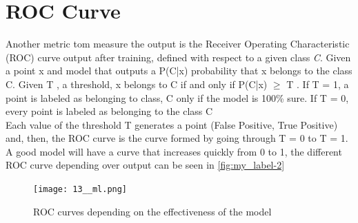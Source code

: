 \section{ROC Curve}
Another metric tom measure the output is the Receiver Operating Characteristic (ROC) curve output after training, defined with respect to
a given class \textit{C}. Given a point x and model that outputs a P(C|x) probability that x belongs to the class C. Given T , a threshold, x belongs to C if and only if P(C|x) $\geq$ T . If T = 1, a point is labeled as belonging to class, C only if the model is 100\% sure. If T = 0, every point is labeled as belonging to the class C\\
Each value of the threshold T generates a point (False Positive, True Positive) and, then, the ROC curve is the curve formed by going through T = 0 to T = 1. A good model will have a curve that increases quickly from 0 to 1, the different ROC curve depending over output can be seen in \autoref{fig:my_label-2}
\begin{figure}[H]
    \centering
    \texttt{[image: 13\_\_ml.png]}
    \caption{ROC curves depending on the effectiveness of the model}
    \label{fig:my_label-2}
\end{figure}
















